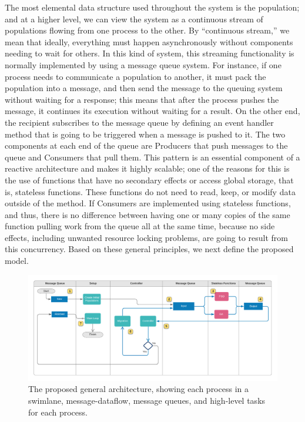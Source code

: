 \documentclass[review]{elsarticle}
\begin{document}
The most elemental data structure used throughout the system is the population; and at a higher
level, we can view the system as a continuous stream of populations
flowing from one process to the other. By ``continuous stream,'' we mean that ideally,
everything must happen asynchronously without components needing to wait for
others. In this kind of system, this streaming functionality is normally
implemented by using a message queue system. For instance, if one process needs
to communicate a population to another, it must pack the population into
a message, and then send the message 
to the queuing system without waiting for a response; this
means that after the process pushes the message, it continues its execution
without waiting for a result. On the other end, the recipient subscribes to the
message queue by defining an event handler method that is going to be triggered when a
message is pushed to it. The two components at each end of the queue are
Producers that push messages to the queue and Consumers that pull them. This
pattern is an essential component of a reactive architecture and makes
it highly scalable; one of the reasons for this is the use of functions
that have no secondary effects or access global storage, that is,
stateless functions. These functions do not need to read, keep, or modify data outside of the method. If
Consumers are implemented using stateless functions, and thus, there is no difference
between having one or many copies of the same function pulling work from the queue all at the
same time, because no side effects, including unwanted resource
locking problems,  are going to result from this concurrency.
Based on these general principles, we next define the proposed model.


\begin{figure}
    \centering
    \includegraphics[width=\textwidth]{KafkEOsmall}
    \caption{The proposed general architecture, 
     showing each process in a swimlane, message-dataflow,
     message queues, and high-level tasks for each process.} 
    \label{fig:kafkEO}
\end{figure}
\end{document}
